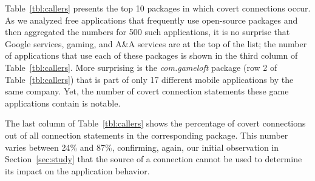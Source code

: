 Table~\ref{tbl:callers} presents the top 10 packages in which
covert connections occur. 
As we analyzed free applications that frequently use open-source packages and then aggregated the numbers for
500 such applications, it is no surprise that Google services, gaming, and A\&A services are at the top of the
list; the number of applications that use each of these packages is shown in the third
column of Table~\ref{tbl:callers}.
More surprising is the \emph{com.gameloft} package (row 2 of Table~\ref{tbl:callers}) that is part of only 17 different mobile applications by the same company. Yet, the number of covert connection statements these game applications contain is notable. 

The last column of Table~\ref{tbl:callers} shows the percentage of covert connections out of all connection statements in the corresponding package. This number varies between 24\% and 87\%, confirming, again, our initial observation in Section~\ref{sec:study} that the source of a connection cannot be used to determine its impact on the application behavior. 


 






